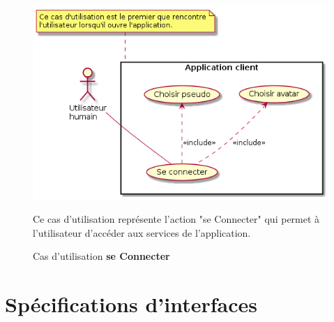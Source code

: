 \documentclass[11pt,dvipsnames,svgnames]{report}
\begin{document}
\begin{center}
\begin{figure}
\includegraphics[scale=0.7]{images/uc-seConnecter.png}
\caption{Cas d'utilisation \textbf{se Connecter}}
	Ce cas d'utilisation représente l'action "se Connecter" qui permet à l'utilisateur d’accéder aux services de l'application.
\end{figure}

\end{center}

\section{Spécifications d'interfaces}
\end{document}
